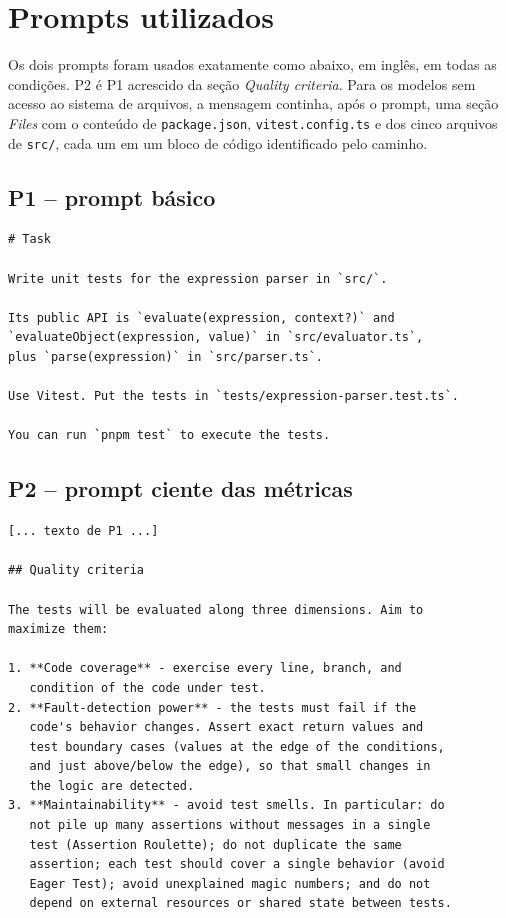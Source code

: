 
\section{Prompts utilizados}
\label{ap:prompts}

Os dois prompts foram usados exatamente como abaixo, em inglês, em todas as condições. P2 é P1 acrescido da seção \textit{Quality criteria}. Para os modelos sem acesso ao sistema de arquivos, a mensagem continha, após o prompt, uma seção \textit{Files} com o conteúdo de \texttt{package.json}, \texttt{vitest.config.ts} e dos cinco arquivos de \texttt{src/}, cada um em um bloco de código identificado pelo caminho.

\subsection*{P1 -- prompt básico}

\begin{lstlisting}[language={}, caption={Prompt P1}, label={lst:p1}]
# Task

Write unit tests for the expression parser in `src/`.

Its public API is `evaluate(expression, context?)` and
`evaluateObject(expression, value)` in `src/evaluator.ts`,
plus `parse(expression)` in `src/parser.ts`.

Use Vitest. Put the tests in `tests/expression-parser.test.ts`.

You can run `pnpm test` to execute the tests.
\end{lstlisting}

\subsection*{P2 -- prompt ciente das métricas}

\begin{lstlisting}[language={}, caption={Prompt P2 (acréscimo a P1)}, label={lst:p2}]
[... texto de P1 ...]

## Quality criteria

The tests will be evaluated along three dimensions. Aim to
maximize them:

1. **Code coverage** - exercise every line, branch, and
   condition of the code under test.
2. **Fault-detection power** - the tests must fail if the
   code's behavior changes. Assert exact return values and
   test boundary cases (values at the edge of the conditions,
   and just above/below the edge), so that small changes in
   the logic are detected.
3. **Maintainability** - avoid test smells. In particular: do
   not pile up many assertions without messages in a single
   test (Assertion Roulette); do not duplicate the same
   assertion; each test should cover a single behavior (avoid
   Eager Test); avoid unexplained magic numbers; and do not
   depend on external resources or shared state between tests.
\end{lstlisting}
